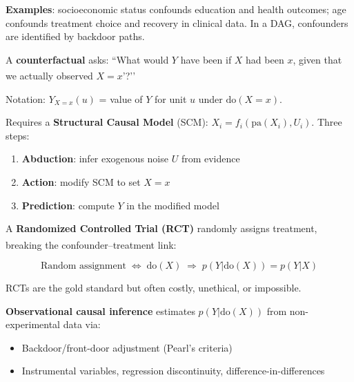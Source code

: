 \begin{tcbitemize}[ skin=sectionraster ]
    \textbf{Examples}: socioeconomic status confounds education and health
    outcomes; age confounds treatment choice and recovery in clinical data.
    In a DAG, confounders are identified by backdoor paths.

    \tcbitem[title=Counterfactuals, raster multicolumn=3]
    A \textbf{counterfactual} asks: ``What would $Y$ have been if $X$ had been
    $x$, given that we actually observed $X{=}x’$?’’\textsuperscript{\cite[][Ch.~7]{pearlCausalityModelsReasoning2009}}

    Notation: $Y_{X=x}(u)$ = value of $Y$ for unit $u$ under
    $\mathrm{do}(X{=}x)$.

    Requires a \textbf{Structural Causal Model} (SCM):
    $X_i = f_i(\mathrm{pa}(X_i), U_i)$.
    Three steps:
    \begin{enumerate}
        \item \textbf{Abduction}: infer exogenous noise $U$ from evidence
        \item \textbf{Action}: modify SCM to set $X{=}x$
        \item \textbf{Prediction}: compute $Y$ in the modified model
    \end{enumerate}

    \tcbitem[title={Causal Inference vs RCTs}, raster multicolumn=3]
    A \textbf{Randomized Controlled Trial (RCT)} randomly assigns treatment,
    breaking the confounder--treatment
    link:\textsuperscript{\cite[][Ch.~1]{hernanCausalInferenceWhat2020}}

    \[ \text{Random assignment} \;\Leftrightarrow\; \mathrm{do}(X)
       \;\Rightarrow\; p(Y|\mathrm{do}(X)) = p(Y|X) \]

    RCTs are the gold standard but often costly, unethical, or impossible.

    \textbf{Observational causal inference} estimates $p(Y|\mathrm{do}(X))$
    from non-experimental data via:
    \begin{itemize}
        \item Backdoor/front-door adjustment (Pearl’s criteria)
        \item Instrumental variables, regression discontinuity,
              difference-in-differences
    \end{itemize}

    \end{tcbitemize}

